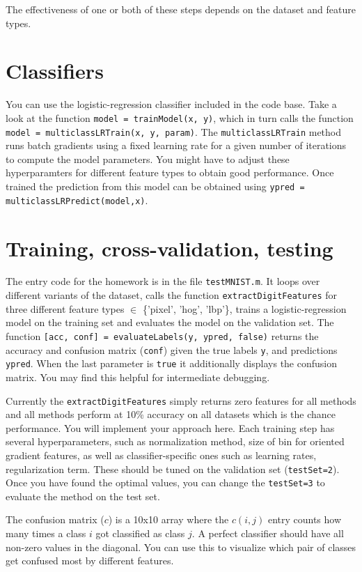 \documentclass[10pt,letterpaper]{article}
\newcommand{\cmd}[1] {{\color{blue}\texttt{#1}}}
\begin{document}
The effectiveness of one or both of these steps depends on the dataset and feature types.



\section{Classifiers}
You can use the logistic-regression classifier included in the code base. Take a look at the function \cmd{model = trainModel(x, y)}, which in turn calls the function \cmd{model = multiclassLRTrain(x, y, param)}. The \cmd{multiclassLRTrain} method runs batch gradients using a fixed learning rate for a given number of iterations to compute the model parameters. You might have to adjust these hyperparamters for different feature types to obtain good performance. Once trained the prediction from this model can be obtained using \cmd{ypred = multiclassLRPredict(model,x)}.


\section{Training, cross-validation, testing}

The entry code for the homework is in the file \cmd{testMNIST.m}. It loops over different  variants of the dataset, calls the function \cmd{extractDigitFeatures} for three different feature types $\in$ \{'pixel', 'hog', 'lbp'\}, trains a logistic-regression model on the training set and evaluates the model on the validation set. The function 
\cmd{[acc, conf] = evaluateLabels(y, ypred, false)} returns the accuracy and confusion matrix (\cmd{conf}) given the true labels \cmd{y}, and predictions \cmd{ypred}. When the last parameter is \cmd{true} it additionally displays the confusion matrix. You may find this helpful for intermediate debugging.

Currently the \cmd{extractDigitFeatures} simply returns zero features for all methods  and all methods perform at 10\% accuracy on all datasets which is the chance performance. You will implement your approach here. Each training step has several hyperparameters, such as normalization method, size of bin for oriented gradient features, as well as classifier-specific ones such as learning rates, regularization term. These should be tuned on the validation set (\cmd{testSet=2}). Once you have found the optimal values, you can change the \cmd{testSet=3} to evaluate the method on the test set.

The confusion matrix ($c$) is a 10x10 array where the $c(i,j)$ entry counts how many times a class $i$ got classified as class $j$. A perfect classifier should have all non-zero values in the diagonal. You can use this to visualize which pair of classes get confused most by different features.
\end{document}
